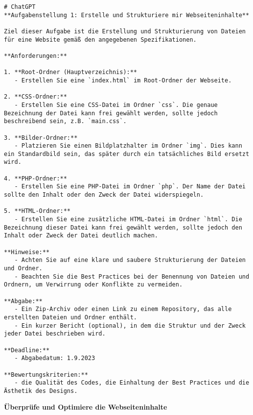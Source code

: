 \documentclass[12pt,a4paper]{scrartcl}
\begin{document}
\begin{lstlisting}
# ChatGPT
**Aufgabenstellung 1: Erstelle und Strukturiere mir Webseiteninhalte**

Ziel dieser Aufgabe ist die Erstellung und Strukturierung von Dateien für eine Website gemäß den angegebenen Spezifikationen.

**Anforderungen:**

1. **Root-Ordner (Hauptverzeichnis):** 
   - Erstellen Sie eine `index.html` im Root-Ordner der Webseite.

2. **CSS-Ordner:** 
   - Erstellen Sie eine CSS-Datei im Ordner `css`. Die genaue Bezeichnung der Datei kann frei gewählt werden, sollte jedoch beschreibend sein, z.B. `main.css`.
   
3. **Bilder-Ordner:** 
   - Platzieren Sie einen Bildplatzhalter im Ordner `img`. Dies kann ein Standardbild sein, das später durch ein tatsächliches Bild ersetzt wird.

4. **PHP-Ordner:** 
   - Erstellen Sie eine PHP-Datei im Ordner `php`. Der Name der Datei sollte den Inhalt oder den Zweck der Datei widerspiegeln.

5. **HTML-Ordner:** 
   - Erstellen Sie eine zusätzliche HTML-Datei im Ordner `html`. Die Bezeichnung dieser Datei kann frei gewählt werden, sollte jedoch den Inhalt oder Zweck der Datei deutlich machen.

**Hinweise:**
   - Achten Sie auf eine klare und saubere Strukturierung der Dateien und Ordner.
   - Beachten Sie die Best Practices bei der Benennung von Dateien und Ordnern, um Verwirrung oder Konflikte zu vermeiden.

**Abgabe:** 
   - Ein Zip-Archiv oder einen Link zu einem Repository, das alle erstellten Dateien und Ordner enthält.
   - Ein kurzer Bericht (optional), in dem die Struktur und der Zweck jeder Datei beschrieben wird.

**Deadline:** 
   - Abgabedatum: 1.9.2023

**Bewertungskriterien:** 
   - die Qualität des Codes, die Einhaltung der Best Practices und die Ästhetik des Designs.
\end{lstlisting}

\textbf{Überprüfe und Optimiere die Webseiteninhalte}
\end{document}

